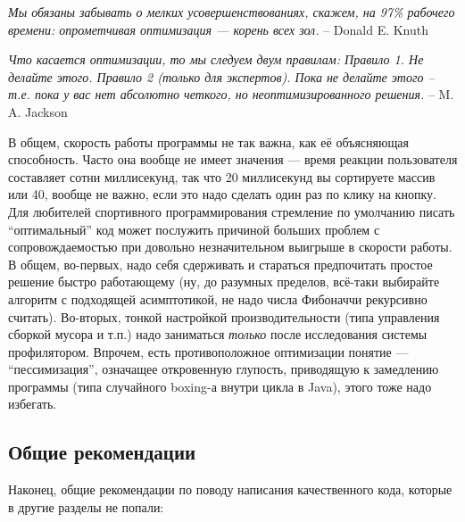 \documentclass{../../text-style}
\begin{document}
\textit{Мы обязаны забывать о мелких усовершенствованиях, ска­жем, на 97\% рабочего времени: опрометчивая оптимизация --- корень всех зол.} \newline
-- Donald E. Knuth

\textit{Что касается оптимизации, то мы следуем двум правилам: \newline
Правило 1. Не делайте этого. \newline
Правило 2 (только для экспертов). Пока не делайте этого -- т.е. пока у вас нет абсолютно четкого, но неоптимизированного решения.} \newline
-- M. A. Jackson

В общем, скорость работы программы не так важна, как её объясняющая способность. Часто она вообще не имеет значения --- время реакции пользователя составляет сотни миллисекунд, так что 20 миллисекунд вы сортируете массив или 40, вообще не важно, если это надо сделать один раз по клику на кнопку. Для любителей спортивного программирования стремление по умолчанию писать ``оптимальный'' код может послужить причиной больших проблем с сопровождаемостью при довольно незначительном выигрыше в скорости работы. В общем, во-первых, надо себя сдерживать и стараться предпочитать простое решение быстро работающему (ну, до разумных пределов, всё-таки выбирайте алгоритм с подходящей асимптотикой, не надо числа Фибоначчи рекурсивно считать). Во-вторых, тонкой настройкой производительности (типа управления сборкой мусора и т.п.) надо заниматься \textit{только} после исследования системы профилятором. Впрочем, есть противоположное оптимизации понятие --- ``пессимизация'', означащее откровенную глупость, приводящую к замедлению программы (типа случайного boxing-а внутри цикла в Java), этого тоже надо избегать.

\subsection{Общие рекомендации}

Наконец, общие рекомендации по поводу написания качественного кода, которые в другие разделы не попали:
\end{document}
